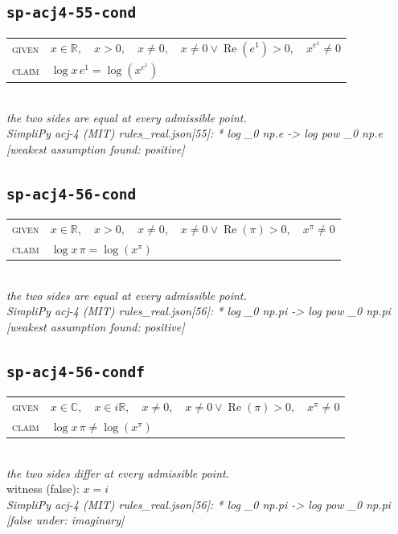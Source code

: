 \documentclass[11pt]{article}
\begin{document}
\subsection*{\texttt{sp-acj4-55-cond}}
\begin{tabular}{@{}l@{\quad}l@{}}
\textsc{given} & $x \in \mathbb{R},\quad x > 0,\quad x \neq 0,\quad x \neq 0 \lor \operatorname{Re}\left(e^{1}\right) > 0,\quad x^{e^{1}} \neq 0$ \\[4pt]
\textsc{claim} & $\displaystyle \log x \, e^{1} = \log\left(x^{e^{1}}\right)$ \\
\end{tabular}\\[2pt]
{\small\emph{the two sides are equal at every admissible point.}}\\
\emph{SimpliPy acj-4 (MIT) rules\_real.json[55]: * log \_0 np.e  ->  log pow \_0 np.e  [weakest assumption found: positive]}\\

\subsection*{\texttt{sp-acj4-56-cond}}
\begin{tabular}{@{}l@{\quad}l@{}}
\textsc{given} & $x \in \mathbb{R},\quad x > 0,\quad x \neq 0,\quad x \neq 0 \lor \operatorname{Re}\left(\pi\right) > 0,\quad x^{\pi} \neq 0$ \\[4pt]
\textsc{claim} & $\displaystyle \log x \, \pi = \log\left(x^{\pi}\right)$ \\
\end{tabular}\\[2pt]
{\small\emph{the two sides are equal at every admissible point.}}\\
\emph{SimpliPy acj-4 (MIT) rules\_real.json[56]: * log \_0 np.pi  ->  log pow \_0 np.pi  [weakest assumption found: positive]}\\

\subsection*{\texttt{sp-acj4-56-condf}}
\begin{tabular}{@{}l@{\quad}l@{}}
\textsc{given} & $x \in \mathbb{C},\quad x \in i\mathbb{R},\quad x \neq 0,\quad x \neq 0 \lor \operatorname{Re}\left(\pi\right) > 0,\quad x^{\pi} \neq 0$ \\[4pt]
\textsc{claim} & $\displaystyle \log x \, \pi \neq \log\left(x^{\pi}\right)$ \\
\end{tabular}\\[2pt]
{\small\emph{the two sides differ at every admissible point.}}\\
{\footnotesize\color{gray}witness (false): $x = i$}\\
\emph{SimpliPy acj-4 (MIT) rules\_real.json[56]: * log \_0 np.pi  ->  log pow \_0 np.pi  [false under: imaginary]}\\
\end{document}
